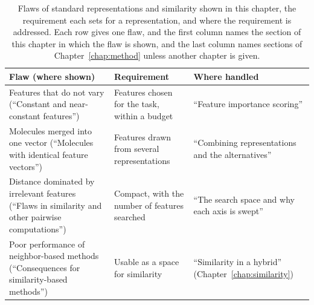\begin{table}[htbp]
\centering
\small
\caption[Flaws of standard representations and similarity, and the requirement each sets.]{Flaws of standard representations and similarity shown in this chapter, the requirement each sets for a representation, and where the requirement is addressed. Each row gives one flaw, and the first column names the section of this chapter in which the flaw is shown, and the last column names sections of Chapter~\ref{chap:method} unless another chapter is given.}
\label{tab:flaws:requirements}
\begin{adjustbox}{max width=\textwidth}
\begin{tabular}{P{0.34\textwidth}P{0.30\textwidth}P{0.28\textwidth}}
\toprule
Flaw (where shown) & Requirement & Where handled \\
\midrule
Features that do not vary (``Constant and near-constant features'') & Features chosen for the task, within a budget & ``Feature importance scoring'' \\
Molecules merged into one vector (``Molecules with identical feature vectors'') & Features drawn from several representations & ``Combining representations and the alternatives'' \\
Distance dominated by irrelevant features (``Flaws in similarity and other pairwise computations'') & Compact, with the number of features searched & ``The search space and why each axis is swept'' \\
Poor performance of neighbor-based methods (``Consequences for similarity-based methods'') & Usable as a space for similarity & ``Similarity in a hybrid'' (Chapter~\ref{chap:similarity}) \\
\bottomrule
\end{tabular}
\end{adjustbox}
\end{table}


